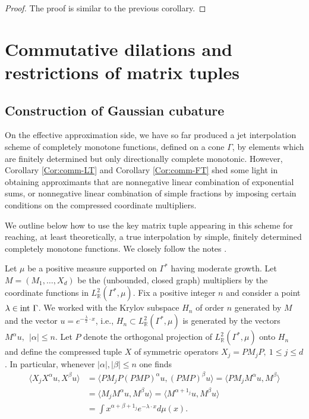\documentclass[11pt,reqno]{amsart}
\theoremstyle{plain}
\theoremstyle{definition}
\numberwithin{equation}{section}
\begin{document}
\begin{proof}
    The proof is similar to the previous corollary.
\end{proof}


    
\section{Commutative dilations and restrictions of matrix tuples} \label{Sec:Comm-dilation}


\subsection{Construction of Gaussian cubature}	On the effective approximation side, we have so far produced a jet interpolation scheme of completely monotone functions, defined on a cone $\Gamma$, by elements which are finitely determined but only directionally complete monotonic. However, Corollary \ref{Cor:comm-LT} and Corollary \ref{Cor:comm-FT} shed some light in obtaining approximants that are nonnegative linear combination of exponential sums, or nonnegative linear combination of simple fractions by imposing certain conditions on the compressed coordinate multipliers.
    
    We outline below how to use the key matrix tuple appearing in this scheme for reaching, at least theoretically, a true interpolation by
	simple, finitely determined completely monotone functions. We closely follow the notes \cite{Dilcub1,Dilcub2}.
	
    Let $\mu$ be a positive measure supported on $\Gamma^\ast$ having moderate growth. Let $M = (M_1, \ldots, X_d)$ be the (unbounded, closed graph) multipliers by the coordinate functions in $L_\mathbb{R}^2(\Gamma^*, \mu)$. Fix a positive integer $n$ and consider a point $\lambda \in {\rm int} \ \Gamma$. We worked  with the Krylov subspace $H_n$ of order $n$ generated by $M$ and the vector $u = e^{- \frac{\lambda}{2} \cdot x}$, i.e., 
	$H_n \subset L_\mathbb{R}^2(\Gamma^*, \mu)$ is generated by the vectors $M^\alpha u, \ \ |\alpha| \leq n.$ Let $P$ denote the orthogonal projection of $L_\mathbb{R}^2(\Gamma^*, \mu)$ onto $H_n$ and define
	the compressed tuple $X$ of symmetric operators $X_j = PM_jP, \ 1 \leq j \leq d$. In particular, whenever $|\alpha|, |\beta| \leq n$ one finds
    \begin{align*}
       \langle X_j X^\alpha u , X^\beta u \rangle &= \langle PM_j P (PMP)^\alpha u , (PMP)^\beta u \rangle   
	  = \langle PM_j M^\alpha u, M^\beta \rangle \\
    & = \langle M_j M^\alpha u, M^\beta u \rangle 
     =  \langle M^{\alpha + 1_j} u, M^\beta u \rangle \\
    & = \int x^{\alpha + \beta + 1_j} e^{- \lambda \cdot x} d\mu(x).
	 \end{align*}
	
\end{document}
